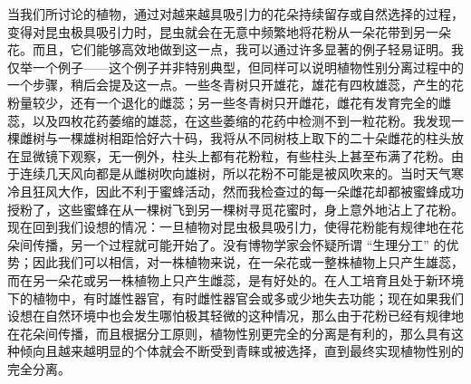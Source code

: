 \documentclass{article}
\begin{document}
当我们所讨论的植物，通过对越来越具吸引力的花朵持续留存或自然选择的过程，变得对昆虫极具吸引力时，昆虫就会在无意中频繁地将花粉从一朵花带到另一朵花。而且，它们能够高效地做到这一点，我可以通过许多显著的例子轻易证明。我仅举一个例子——这个例子并非特别典型，但同样可以说明植物性别分离过程中的一个步骤，稍后会提及这一点。一些冬青树只开雄花，雄花有四枚雄蕊，产生的花粉量较少，还有一个退化的雌蕊；另一些冬青树只开雌花，雌花有发育完全的雌蕊，以及四枚花药萎缩的雄蕊，在这些萎缩的花药中检测不到一粒花粉。我发现一棵雌树与一棵雄树相距恰好六十码，我将从不同树枝上取下的二十朵雌花的柱头放在显微镜下观察，无一例外，柱头上都有花粉粒，有些柱头上甚至布满了花粉。由于连续几天风向都是从雌树吹向雄树，所以花粉不可能是被风吹来的。当时天气寒冷且狂风大作，因此不利于蜜蜂活动，然而我检查过的每一朵雌花却都被蜜蜂成功授粉了，这些蜜蜂在从一棵树飞到另一棵树寻觅花蜜时，身上意外地沾上了花粉。现在回到我们设想的情况：一旦植物对昆虫极具吸引力，使得花粉能有规律地在花朵间传播，另一个过程就可能开始了。没有博物学家会怀疑所谓 “生理分工” 的优势；因此我们可以相信，对一株植物来说，在一朵花或一整株植物上只产生雄蕊，而在另一朵花或另一株植物上只产生雌蕊，是有好处的。在人工培育且处于新环境下的植物中，有时雄性器官，有时雌性器官会或多或少地失去功能；现在如果我们设想在自然环境中也会发生哪怕极其轻微的这种情况，那么由于花粉已经有规律地在花朵间传播，而且根据分工原则，植物性别更完全的分离是有利的，那么具有这种倾向且越来越明显的个体就会不断受到青睐或被选择，直到最终实现植物性别的完全分离。 
\end{document}
